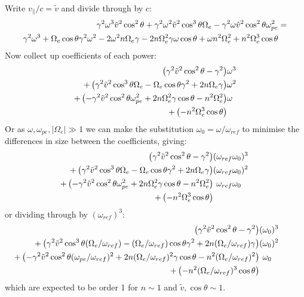 \documentclass[]{article}
\begin{document}
Write $v_\parallel / c = \tilde{v}$ and divide through by $c$:
\begin{align}
\gamma^2\omega^3 \tilde{v}^2 \cos^2 \theta + \gamma^2 \omega^2 \tilde{v}^2 \cos^3\theta\Omega_e - \gamma^2\omega \tilde{v}^2\cos^2\theta\omega_{pe}^2 &=\notag\\ \gamma^2 \omega^3 +  \Omega_e\cos\theta \gamma^2\omega^2 - 2  \omega^2 n\Omega_e\gamma - 2  n \Omega_e^2 \gamma\omega\cos\theta +  \omega n^2\Omega_e^2 +  n^2\Omega_e^3\cos\theta&
\end{align}
Now collect up coefficients of each power:
\begin{align}
\left(\gamma^2 \tilde{v}^2 \cos^2 \theta - \gamma^2   \right)&\omega^3  \notag\\
+\left(\gamma^2 \tilde{v}^2 \cos^3\theta\Omega_e  -\Omega_e\cos\theta \gamma^2  + 2 n\Omega_e\gamma  \right)&\omega^2  \notag\\
+\left(- \gamma^2 \tilde{v}^2\cos^2\theta\omega_{pe}^2  +2  n \Omega_e^2 \gamma\cos\theta  - n^2\Omega_e^2   \right)&\omega \notag\\
+\left(  -n^2\Omega_e^3\cos\theta   \right)&
\end{align}
Or as $\omega , \omega_{pe}, |\Omega_e| \gg 1$ we can make the substitution $ \omega_0 = \omega/\omega_{ref}$ to minimise the differences in size between the coefficients, giving:
\begin{align}
\left(\gamma^2 \tilde{v}^2 \cos^2 \theta - \gamma^2   \right)&(\omega_{ref}\omega_0)^3 \notag \\
+\left(\gamma^2 \tilde{v}^2 \cos^3\theta\Omega_e  -\Omega_e\cos\theta \gamma^2  + 2 n\Omega_e\gamma  \right)&(\omega_{ref}\omega_0)^2  \notag\\
+\left(- \gamma^2 \tilde{v}^2\cos^2\theta\omega_{pe}^2  +2  n \Omega_e^2 \gamma\cos\theta  - n^2\Omega_e^2   \right)&\phantom{(}\omega_{ref}\omega_0\phantom{)^2}  \notag\\
+\left(  -n^2\Omega_e^3\cos\theta   \right)&\phantom{(\omega_ref\omega_0)^2} 
\end{align}
or dividing through by $(\omega_{ref})^3$:
\begin{align}
\left(\gamma^2 \tilde{v}^2 \cos^2 \theta - \gamma^2   \right)&(\omega_0)^3 \notag \\
+\left(\gamma^2 \tilde{v}^2 \cos^3\theta(\Omega_e/\omega_{ref})  -(\Omega_e/\omega_{ref})\cos\theta \gamma^2  + 2 n(\Omega_e/\omega_{ref})\gamma  \right)&(\omega_0)^2  \notag\\
+\left(- \gamma^2 \tilde{v}^2\cos^2\theta(\omega_{pe}/\omega_{ref})^2  +2  n (\Omega_e/\omega_{ref})^2 \gamma\cos\theta  - n^2(\Omega_e/\omega_{ref})^2   \right)&\phantom{(}\omega_0\phantom{)^2}  \notag\\
+\left(  -n^2(\Omega_e/\omega_{ref})^3\cos\theta   \right)&\phantom{(\omega_ref\omega_0)^2} 
\end{align}
which are expected to be order 1 for $n \sim 1$ and $\tilde{v}, \cos\theta \sim 1$.
\end{document}
